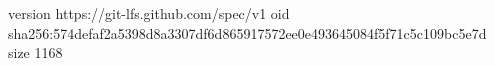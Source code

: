 version https://git-lfs.github.com/spec/v1
oid sha256:574defaf2a5398d8a3307df6d865917572ee0e493645084f5f71c5c109bc5e7d
size 1168
